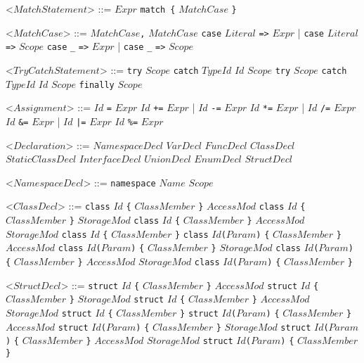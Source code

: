 \documentclass{article}
\newcommand{\gtext}[1]{<$#1$>}
\newcommand{\glit}[1]{\texttt{#1}}
\begin{document}
\begin{grammar}
	\newpage	
	
	\gtext{MatchStatement} ::= $Expr$ \glit{match \{} $MatchCase$ \glit{\}} 
	
	\gtext{MatchCase} ::= $MatchCase$\glit{,} $MatchCase$
	\alt \glit{case} $Literal$ \glit{=>} $Expr$ | \glit{case} $Literal$ \glit{=>} $Scope$
	\alt \glit{case} \glit{_} \glit{=>} $Expr$ | \glit{case} \glit{_} \glit{=>} $Scope$

	\gtext{TryCatchStatement} ::= \glit{try} $Scope$ \glit{catch} $TypeId$ $Id$ $Scope$  
	\alt \glit{try} $Scope$ \glit{catch} $TypeId$ $Id$ $Scope$ \glit{finally} $Scope$

	\gtext{Assignment} ::= $Id$ \glit{=} $Expr$
	\alt $Id$ \glit{+=} $Expr$ | $Id$ \glit{-=} $Expr$
	\alt $Id$ \glit{*=} $Expr$ | $Id$ \glit{/=} $Expr$
	\alt $Id$ \glit{\&=} $Expr$ | $Id$ \glit{|=} $Expr$
	\alt $Id$ \glit{\%=} $Expr$
	
	\gtext{Declaration} ::=  $NamespaceDecl$
	\alt $VarDecl$
	\alt $FuncDecl$
	\alt $ClassDecl$
	\alt $StaticClassDecl$
	\alt $InterfaceDecl$
	\alt $UnionDecl$
	\alt $EnumDecl$
	\alt $StructDecl$
	
	\gtext{NamespaceDecl} ::= \glit{namespace} $Name$ $Scope$
	
	\gtext{ClassDecl} ::= \glit{class} $Id$ \glit{\{} $ClassMember$ \glit{\}}
	\alt $AccessMod$ \glit{class} $Id$ \glit{\{} $ClassMember$ \glit{\}}
	\alt $StorageMod$ \glit{class} $Id$ \glit{\{} $ClassMember$ \glit{\}}
	\alt $AccessMod$ $StorageMod$ \glit{class} $Id$ \glit{\{} $ClassMember$ \glit{\}}
	\alt \glit{class} $Id$\glit{(}$Param$\glit{)} \glit{\{} $ClassMember$ \glit{\}}
	\alt $AccessMod$ \glit{class} $Id$\glit{(}$Param$\glit{)} \glit{\{} $ClassMember$ \glit{\}}
	\alt $StorageMod$ \glit{class} $Id$\glit{(}$Param$\glit{)} \glit{\{} $ClassMember$ \glit{\}}
	\alt $AccessMod$ $StorageMod$ \glit{class} $Id$\glit{(}$Param$\glit{)} \glit{\{} $ClassMember$ \glit{\}}
	
	\gtext{StructDecl} ::= \glit{struct} $Id$ \glit{\{} $ClassMember$ \glit{\}}
	\alt $AccessMod$ \glit{struct} $Id$ \glit{\{} $ClassMember$ \glit{\}}
	\alt $StorageMod$ \glit{struct} $Id$ \glit{\{} $ClassMember$ \glit{\}}
	\alt $AccessMod$ $StorageMod$ \glit{struct} $Id$ \glit{\{} $ClassMember$ \glit{\}}
	\alt \glit{struct} $Id$\glit{(}$Param$\glit{)} \glit{\{} $ClassMember$ \glit{\}}
	\alt $AccessMod$ \glit{struct} $Id$\glit{(}$Param$\glit{)} \glit{\{} $ClassMember$ \glit{\}}
	\alt $StorageMod$ \glit{struct} $Id$\glit{(}$Param$\glit{)} \glit{\{} $ClassMember$ \glit{\}}
	\alt $AccessMod$ $StorageMod$ \glit{struct} $Id$\glit{(}$Param$\glit{)} \glit{\{} $ClassMember$ \glit{\}}
	

\end{grammar}
\end{document}
